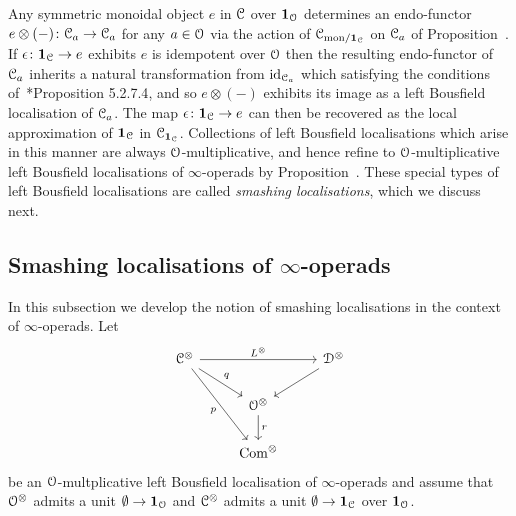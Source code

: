 \begin{remark}
\label{remark:action-of-idempotent}%
Any symmetric monoidal object $e$ in $\mathcal C$ over $\mathbf{1}_{\mathcal{O}}$ determines an endo-functor $e \otimes (-)\colon \mathcal C_a \to \mathcal C_a$ for any $a \in \mathcal{O}$ via the action of 
$\mathcal C_{\mathrm{mon}/\mathbf{1}_{\mathcal C}}$
on $\mathcal C_a$ of Proposition~.
If $\epsilon\colon \mathbf{1}_{\mathcal C} \to e$ exhibits $e$ is idempotent over $\mathcal{O}$ then the resulting endo-functor of $\mathcal C_a$ inherits a natural transformation from $\mathrm{id}_{\mathcal C_a}$ which satisfying the conditions of~\cite{HTT}*{Proposition 5.2.7.4}, and so $e \otimes (-)$ exhibits its image as a left Bousfield localisation of $\mathcal C_a$. The map $\epsilon\colon \mathbf{1}_{\mathcal C} \to e$ can then be recovered as the local approximation of $\mathbf{1}_{\mathcal C}$ in $\mathcal C_{\mathbf{1}_{\mathcal C}}$. Collections of left Bousfield localisations which arise in this manner are always $\mathcal{O}$-multiplicative, and hence refine to $\mathcal{O}$-multiplicative left Bousfield localisations of $\infty$-operads 
by Proposition~. These special types of left Bousfield localisations are called \emph{smashing localisations}, which we discuss next.
\end{remark}












\subsection{Smashing localisations of \texorpdfstring{$\infty$-}{}operads}
\label{subsection:smashing-localisations}%


In this subsection we develop the notion of smashing localisations in the context of $\infty$-operads.
Let
\[
\begin{tikzcd}
\C^{\otimes} \ar[dr,"q"]\ar[ddr,"p"']\ar[rr,"L^{\otimes}"] && \ar[dl] \D^{\otimes}\\
& \cO^{\otimes} \ar[d,"r"] & \\
& \Com^{\otimes} &
\end{tikzcd}
\]
be an $\mathcal{O}$-multplicative left Bousfield localisation of $\infty$-operads and assume that %
$\mathcal{O}^{\otimes}$ admits a unit $\emptyset \to \mathbf{1}_{\mathcal{O}}$ and 
$\mathcal C^{\otimes}$ admits a unit $\emptyset \to \mathbf{1}_{\mathcal C}$ over $\mathbf{1}_{\mathcal{O}}$.

